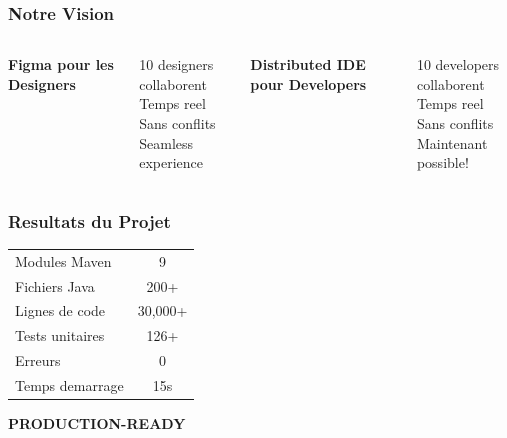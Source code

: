 \documentclass[aspectratio=16:9]{beamer}
\begin{document}
\begin{frame}
  \frametitle{Notre Vision}
  
  \begin{columns}
    \centering
    \textbf{Figma pour les Designers}
    
    \medskip
    
    10 designers collaborent\\
    Temps reel\\
    Sans conflits\\
    \textcolor{SuccessGreen}{Seamless experience}
    
    \centering
    \textbf{Distributed IDE pour Developers}
    
    \medskip
    
    10 developers collaborent\\
    Temps reel\\
    Sans conflits\\
    \textcolor{SuccessGreen}{Maintenant possible!}
  \end{columns}
\end{frame}

\begin{frame}
  \frametitle{Resultats du Projet}
  
  \centering
  
  \begin{tabular}{l|c}
    \hline
    Modules Maven & 9 \\
    Fichiers Java & 200+ \\
    Lignes de code & 30,000+ \\
    Tests unitaires & 126+ \\
    Erreurs & 0 \\
    Temps demarrage & 15s \\
    \hline
  \end{tabular}
  
  \vspace{0.8cm}
  
  \Large\textcolor{SuccessGreen}{\textbf{PRODUCTION-READY}}
\end{frame}
\end{document}
